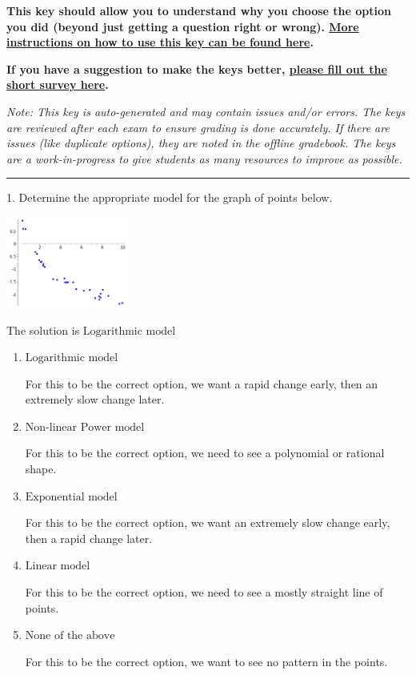 \documentclass{extbook}[14pt]
\begin{document}
\textbf{This key should allow you to understand why you choose the option you did (beyond just getting a question right or wrong). \href{https://xronos.clas.ufl.edu/mac1105spring2020/courseDescriptionAndMisc/Exams/LearningFromResults}{More instructions on how to use this key can be found here}.}

\textbf{If you have a suggestion to make the keys better, \href{https://forms.gle/CZkbZmPbC9XALEE88}{please fill out the short survey here}.}

\textit{Note: This key is auto-generated and may contain issues and/or errors. The keys are reviewed after each exam to ensure grading is done accurately. If there are issues (like duplicate options), they are noted in the offline gradebook. The keys are a work-in-progress to give students as many resources to improve as possible.}

\rule{\textwidth}{0.4pt}

1. Determine the appropriate model for the graph of points below.
\begin{center} \includegraphics[width=0.3\textwidth]{../Figures/identifyModelGraph11A.png} \end{center} 

The solution is $ \text{Logarithmic model} $ 

\begin{enumerate}[label=\Alph*.] 
\item $ \text{Logarithmic model} $ 

 For this to be the correct option, we want a rapid change early, then an extremely slow change later. 
\item $ \text{Non-linear Power model} $ 

 For this to be the correct option, we need to see a polynomial or rational shape. 
\item $ \text{Exponential model} $ 

 For this to be the correct option, we want an extremely slow change early, then a rapid change later. 
\item $ \text{Linear model} $ 

 For this to be the correct option, we need to see a mostly straight line of points. 
\item $ \text{None of the above} $ 

 For this to be the correct option, we want to see no pattern in the points. 
\end{enumerate} 
 
\end{document}
